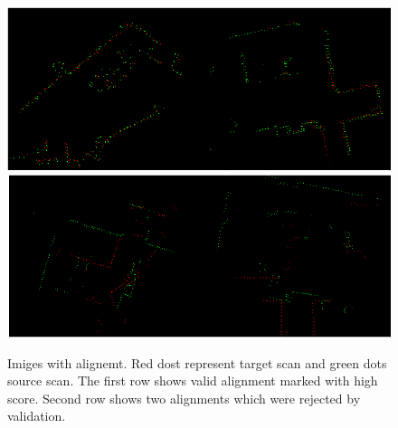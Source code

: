 \begin{figure}
	\centering
	\includegraphics[width=150mm]{../img/good_align.png}
	\includegraphics[width=150mm]{../img/bad_align.png}
	\caption{Imiges with alignemt. Red dost represent target scan and green dots source scan. The first row shows valid alignment marked with high score. Second row shows two alignments which were rejected by validation.}
	\label{fig:bad_align}
\end{figure}
\newpage
